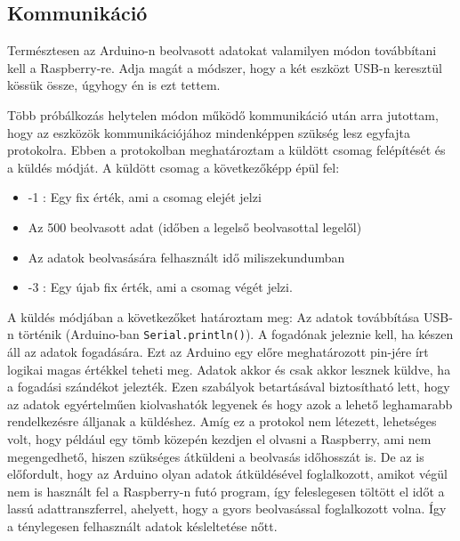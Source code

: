 \documentclass[12pt,a4paper]{article}
\begin{document}
    \subsection{Kommunikáció}
      Természtesen az Arduino-n beolvasott adatokat valamilyen módon továbbítani kell a Raspberry-re. Adja magát a módszer, hogy a két eszközt USB-n keresztül kössük össze, úgyhogy én is ezt tettem.

      Több próbálkozás helytelen módon működő kommunikáció után arra jutottam, hogy az eszközök kommunikációjához mindenképpen szükség lesz egyfajta protokolra. Ebben a protokolban meghatároztam a küldött csomag felépítését és a küldés módját. A küldött csomag a következőképp épül fel:
      \begin{itemize}
        \item -1 : Egy fix érték, ami a csomag elejét jelzi
        \item Az 500 beolvasott adat (időben a legelső beolvasottal legelől)
        \item Az adatok beolvasására felhasznált idő miliszekundumban
        \item -3 : Egy újab fix érték, ami a csomag végét jelzi.
      \end{itemize}
      A küldés módjában a következőket határoztam meg: Az adatok továbbítása USB-n történik (Arduino-ban \texttt{Serial.println()}). A fogadónak jeleznie kell, ha készen áll az adatok fogadására. Ezt az Arduino egy előre meghatározott pin-jére írt logikai magas értékkel teheti meg. Adatok akkor és csak akkor lesznek küldve, ha a fogadási szándékot jelezték.
      Ezen szabályok betartásával biztosítható lett, hogy az adatok egyértelműen kiolvashatók legyenek és hogy azok a lehető leghamarabb rendelkezésre álljanak a küldéshez. Amíg ez a protokol nem létezett, lehetséges volt, hogy például egy tömb közepén kezdjen el olvasni a Raspberry, ami nem megengedhető, hiszen szükséges átküldeni a beolvasás időhosszát is. De az is előfordult, hogy az Arduino olyan adatok átküldésével foglalkozott, amikot végül nem is használt fel a Raspberry-n futó program, így feleslegesen töltött el időt a lassú adattranszferrel, ahelyett, hogy a gyors beolvasással foglalkozott volna. Így a ténylegesen felhasznált adatok késleltetése nőtt.
\end{document}
